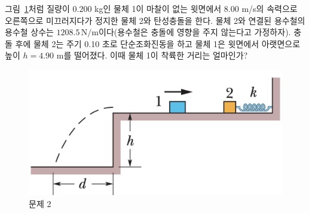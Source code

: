\documentclass[floatfix,nofootinbib,superscriptaddress,fleqn]{revtex4-2}
\begin{document}
그림~\ref{fig:1}처럼 질량이 $0.200$ kg인 물체 1이 마찰이 없는 윗면에서
8.00 m/s의 속력으로 오른쪽으로 미끄러지다가 정지한 물체 2와
탄성충돌을 한다. 물체 2와 연결된 용수철의 용수철 상수는
$1208.5\,\mathrm{N/m}$이다(용수철은 충돌에 영향을 주지 않는다고 가정하자).
충돌 후에 물체 2는 주기 0.10 초로 단순조화진동을 하고 물체 1은
윗면에서 아랫면으로 높이 $h=4.90$ m를 떨어졌다. 이때 물체 1이 착륙한
거리는 얼마인가? 
\begin{figure}[ht]
  \centering
\includegraphics[scale=0.35]{Qfig18-1-20220511.png}
  \caption{문제 2}
  \label{fig:1}
\end{figure}
\end{document}
